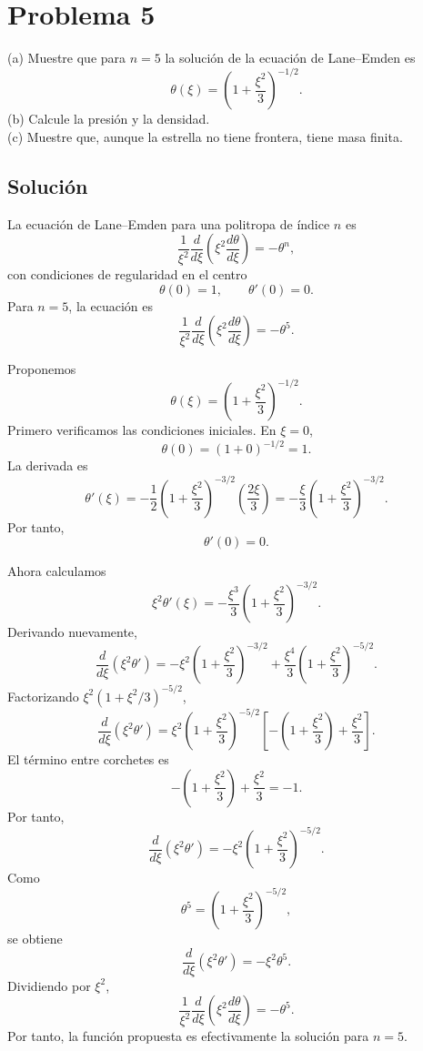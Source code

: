 \documentclass[a4paper]{article}
\begin{document}
\section{Problema 5}

(a) Muestre que para $n=5$ la solución de la ecuación de Lane--Emden es
$$
\theta(\xi)=\left(1+\frac{\xi^2}{3}\right)^{-1/2}.
$$
(b) Calcule la presión y la densidad. \\
(c) Muestre que, aunque la estrella no tiene frontera, tiene masa finita.

\subsection{Solución}
La ecuación de Lane--Emden para una politropa de índice $n$ es
$$
\frac{1}{\xi^2}\frac{d}{d\xi}
\left(
\xi^2\frac{d\theta}{d\xi}
\right)
=-\theta^n,
$$
con condiciones de regularidad en el centro
$$
\theta(0)=1, \qquad \theta'(0)=0.
$$
Para $n=5$, la ecuación es
$$
\frac{1}{\xi^2}\frac{d}{d\xi}
\left(
\xi^2\frac{d\theta}{d\xi}
\right)
=-\theta^5.
$$

Proponemos
$$
\theta(\xi)=\left(1+\frac{\xi^2}{3}\right)^{-1/2}.
$$
Primero verificamos las condiciones iniciales. En $\xi=0$,
$$
\theta(0)=\left(1+0\right)^{-1/2}=1.
$$
La derivada es
$$
\theta'(\xi)
=
-\frac{1}{2}
\left(1+\frac{\xi^2}{3}\right)^{-3/2}
\left(\frac{2\xi}{3}\right)
=
-\frac{\xi}{3}
\left(1+\frac{\xi^2}{3}\right)^{-3/2}.
$$
Por tanto,
$$
\theta'(0)=0.
$$

Ahora calculamos
$$
\xi^2\theta'(\xi)
=
-\frac{\xi^3}{3}
\left(1+\frac{\xi^2}{3}\right)^{-3/2}.
$$
Derivando nuevamente,
$$
\frac{d}{d\xi}\left(\xi^2\theta'\right)
=
-\xi^2
\left(1+\frac{\xi^2}{3}\right)^{-3/2}
+
\frac{\xi^4}{3}
\left(1+\frac{\xi^2}{3}\right)^{-5/2}.
$$
Factorizando $\xi^2\left(1+\xi^2/3\right)^{-5/2}$,
$$
\frac{d}{d\xi}\left(\xi^2\theta'\right)
=
\xi^2
\left(1+\frac{\xi^2}{3}\right)^{-5/2}
\left[
-\left(1+\frac{\xi^2}{3}\right)
+\frac{\xi^2}{3}
\right].
$$
El término entre corchetes es
$$
-\left(1+\frac{\xi^2}{3}\right)+\frac{\xi^2}{3}=-1.
$$
Por tanto,
$$
\frac{d}{d\xi}\left(\xi^2\theta'\right)
=
-\xi^2
\left(1+\frac{\xi^2}{3}\right)^{-5/2}.
$$
Como
$$
\theta^5=
\left(1+\frac{\xi^2}{3}\right)^{-5/2},
$$
se obtiene
$$
\frac{d}{d\xi}\left(\xi^2\theta'\right)
=
-\xi^2\theta^5.
$$
Dividiendo por $\xi^2$,
$$
\frac{1}{\xi^2}\frac{d}{d\xi}
\left(
\xi^2\frac{d\theta}{d\xi}
\right)
=
-\theta^5.
$$
Por tanto, la función propuesta es efectivamente la solución para $n=5$.
\end{document}
